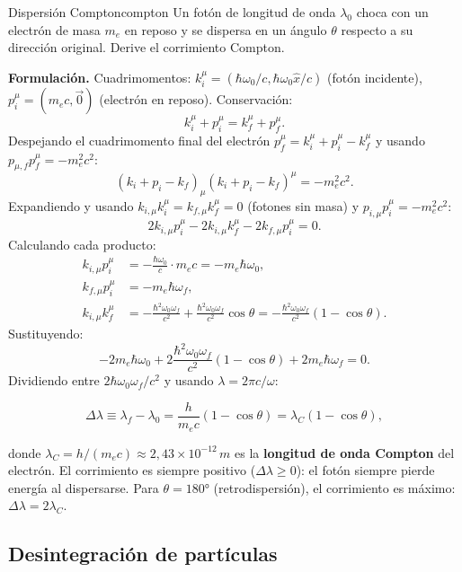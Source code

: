 \begin{ejemplo}{Dispersión Compton}{compton}
Un fotón de longitud de onda $\lambda_0$ choca con un electrón de masa $m_e$ en reposo y se dispersa en un ángulo $\theta$ respecto a su dirección original. Derive el corrimiento Compton.

\textbf{Formulación.} Cuadrimomentos: $k^\mu_i = (\hbar\omega_0/c, \hbar\omega_0\hat{x}/c)$ (fotón incidente), $p^\mu_i = (m_e c, \vec{0})$ (electrón en reposo). Conservación:
\[
  k^\mu_i + p^\mu_i = k^\mu_f + p^\mu_f.
\]
Despejando el cuadrimomento final del electrón $p^\mu_f = k^\mu_i + p^\mu_i - k^\mu_f$ y usando $p_{\mu,f}p^\mu_f = -m_e^2 c^2$:
\[
  (k_i + p_i - k_f)_\mu (k_i + p_i - k_f)^\mu = -m_e^2 c^2.
\]
Expandiendo y usando $k_{i,\mu}k^\mu_i = k_{f,\mu}k^\mu_f = 0$ (fotones sin masa) y $p_{i,\mu}p^\mu_i = -m_e^2 c^2$:
\[
  2k_{i,\mu}p_i^\mu - 2k_{i,\mu}k_f^\mu - 2k_{f,\mu}p_i^\mu = 0.
\]
Calculando cada producto:
\begin{align*}
  k_{i,\mu}p_i^\mu &= -\frac{\hbar\omega_0}{c}\cdot m_e c = -m_e\hbar\omega_0, \\
  k_{f,\mu}p_i^\mu &= -m_e\hbar\omega_f, \\
  k_{i,\mu}k_f^\mu &= -\frac{\hbar^2\omega_0\omega_f}{c^2} + \frac{\hbar^2\omega_0\omega_f}{c^2}\cos\theta
  = -\frac{\hbar^2\omega_0\omega_f}{c^2}(1-\cos\theta).
\end{align*}
Sustituyendo:
\[
  -2m_e\hbar\omega_0 + 2\frac{\hbar^2\omega_0\omega_f}{c^2}(1-\cos\theta) + 2m_e\hbar\omega_f = 0.
\]
Dividiendo entre $2\hbar\omega_0\omega_f/c^2$ y usando $\lambda = 2\pi c/\omega$:

\begin{equation}
  \boxed{\Delta\lambda \equiv \lambda_f - \lambda_0 = \frac{h}{m_e c}(1 - \cos\theta) = \lambda_C(1-\cos\theta),}
  \label{eq:compton}
\end{equation}

donde $\lambda_C = h/(m_e c) \approx 2{,}43 \times 10^{-12}\,\si{m}$ es la \textbf{longitud de onda Compton} del electrón. El corrimiento es siempre positivo ($\Delta\lambda \geq 0$): el fotón siempre pierde energía al dispersarse. Para $\theta = 180°$ (retrodispersión), el corrimiento es máximo: $\Delta\lambda = 2\lambda_C$.
\end{ejemplo}

\subsection{Desintegración de partículas}

